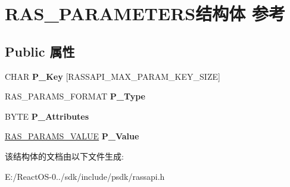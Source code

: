 \hypertarget{struct_r_a_s___p_a_r_a_m_e_t_e_r_s}{}\section{R\+A\+S\+\_\+\+P\+A\+R\+A\+M\+E\+T\+E\+R\+S结构体 参考}
\label{struct_r_a_s___p_a_r_a_m_e_t_e_r_s}
\subsection*{Public 属性}
\begin{DoxyCompactItemize}
\item 
\mbox{\label{struct_r_a_s___p_a_r_a_m_e_t_e_r_s_a34ebd4a74a4bc4200d6e7077a332b143}} 
C\+H\+AR {\bfseries P\+\_\+\+Key} \mbox{[}R\+A\+S\+S\+A\+P\+I\+\_\+\+M\+A\+X\+\_\+\+P\+A\+R\+A\+M\+\_\+\+K\+E\+Y\+\_\+\+S\+I\+ZE\mbox{]}
\item 
\mbox{\label{struct_r_a_s___p_a_r_a_m_e_t_e_r_s_afc296a76e82b495382b8064ee68bfa83}} 
R\+A\+S\+\_\+\+P\+A\+R\+A\+M\+S\+\_\+\+F\+O\+R\+M\+AT {\bfseries P\+\_\+\+Type}
\item 
\mbox{\label{struct_r_a_s___p_a_r_a_m_e_t_e_r_s_aebba23601e37539274d2c41bcc0811ec}} 
B\+Y\+TE {\bfseries P\+\_\+\+Attributes}
\item 
\mbox{\label{struct_r_a_s___p_a_r_a_m_e_t_e_r_s_aa9ff2c913582332c41785dfd9a441985}} 
\hyperlink{union_r_a_s___p_a_r_a_m_s___v_a_l_u_e}{R\+A\+S\+\_\+\+P\+A\+R\+A\+M\+S\+\_\+\+V\+A\+L\+UE} {\bfseries P\+\_\+\+Value}
\end{DoxyCompactItemize}


该结构体的文档由以下文件生成\+:\begin{DoxyCompactItemize}
\item 
E\+:/\+React\+O\+S-\/0../sdk/include/psdk/rassapi.\+h\end{DoxyCompactItemize}

